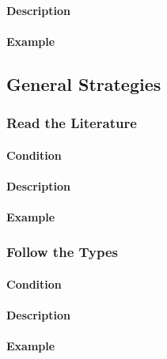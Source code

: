 \paragraph{Description}
\paragraph{Example}


\subsection{General Strategies}

\subsubsection{Read the Literature}
\paragraph{Condition}
\paragraph{Description}
\paragraph{Example}

\subsubsection{Follow the Types}
\paragraph{Condition}
\paragraph{Description}
\paragraph{Example}
